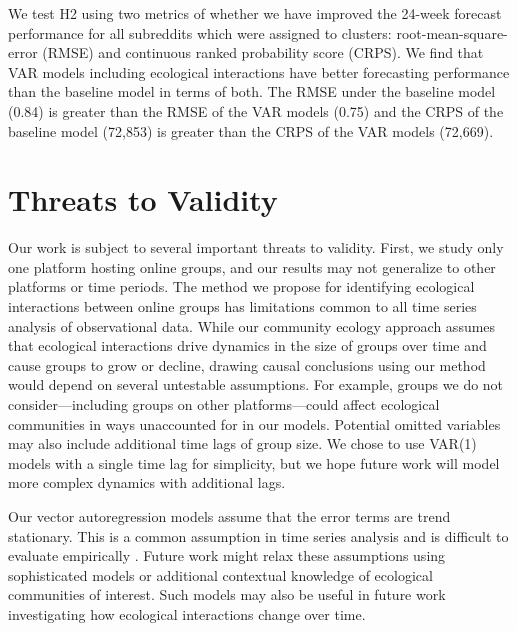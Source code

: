 \documentclass[letterpaper]{article}\usepackage[]{graphicx}\usepackage[]{color}
\begin{document}
We test H2 using two metrics of whether we have improved the 24-week forecast performance for all  subreddits which were assigned to clusters: root-mean-square-error (RMSE) and continuous ranked probability score (CRPS).
We find that VAR models including ecological interactions have better forecasting performance than the baseline model in terms of both. The RMSE under the baseline model (0.84) is greater than the RMSE of the VAR models (0.75) and the CRPS of the baseline model (72,853) is   greater than the CRPS of the VAR models (72,669).


\section{Threats to Validity}
\label{sec:limitations}
Our work is subject to several important threats to validity. First, we study only one platform hosting online groups, and our results may not generalize to other platforms or time periods.
The method we propose for identifying ecological interactions between online groups has limitations common to all time series analysis of observational data. 
While our community ecology approach assumes that ecological interactions drive dynamics in the size of groups over time and cause groups to grow or decline, drawing causal conclusions using our method would depend on several untestable assumptions. For example, groups we do not consider---including groups on other platforms---could affect ecological communities in ways unaccounted for in our models.  Potential omitted variables may also include additional time lags of group size.  We chose to use VAR(1) models with a single time lag for simplicity, but we hope future work will model more complex dynamics with additional lags.

Our vector autoregression models assume that the error terms are trend stationary. This is a common assumption in time series analysis and is difficult to evaluate empirically  \cite{ives_estimating_2003}. 
Future work might relax these assumptions using sophisticated models or additional contextual knowledge of ecological communities of interest. 
Such models may also be useful in future work investigating how ecological interactions change over time.
\end{document}

